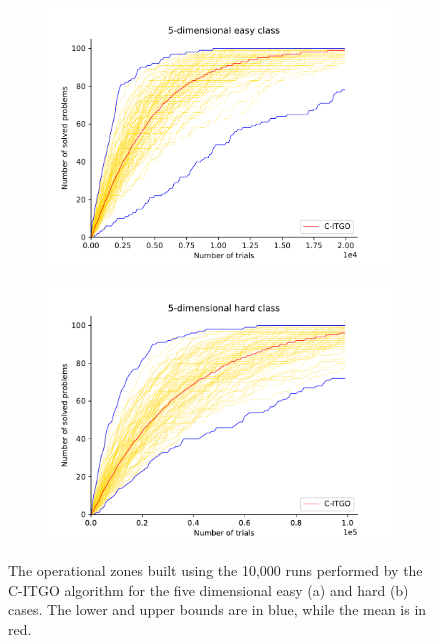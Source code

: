 \begin{figure}[h]
    \centering
    \begin{subfigure}{.5\textwidth}
      \centering
      \includegraphics[width=1.1\linewidth]{Imgs/mult_5E}
      \caption{}
      \label{fig:OpZone_a}
    \end{subfigure}%
    \begin{subfigure}{.5\textwidth}
      \centering
      \includegraphics[width=1.1\linewidth]{Imgs/mult_5H}
      \caption{}
      \label{fig:OpZone_b}
    \end{subfigure}
    \caption{The operational zones built using the 10,000 runs performed by the C-ITGO algorithm for the five dimensional easy (a) and hard (b) cases. The lower and upper bounds are in blue, while the mean is in red.}\label{fig:OpZone}
\end{figure}


